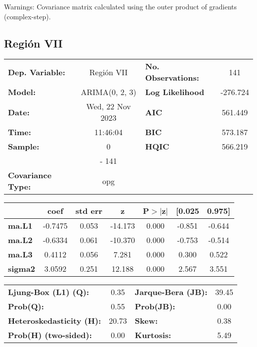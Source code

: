 \documentclass{article}%
\begin{document}
Warnings: \newline
 [1] Covariance matrix calculated using the outer product of gradients (complex-step).%
\subsection*{Región VII}%
\begin{center}
\begin{tabular}{lclc}
\toprule
\textbf{Dep. Variable:}          &    Región VII    & \textbf{  No. Observations:  } &    141      \\
\textbf{Model:}                  &  ARIMA(0, 2, 3)  & \textbf{  Log Likelihood     } &  -276.724   \\
\textbf{Date:}                   & Wed, 22 Nov 2023 & \textbf{  AIC                } &  561.449    \\
\textbf{Time:}                   &     11:46:04     & \textbf{  BIC                } &  573.187    \\
\textbf{Sample:}                 &        0         & \textbf{  HQIC               } &  566.219    \\
\textbf{}                        &       - 141      & \textbf{                     } &             \\
\textbf{Covariance Type:}        &       opg        & \textbf{                     } &             \\
\bottomrule
\end{tabular}
\begin{tabular}{lcccccc}
                & \textbf{coef} & \textbf{std err} & \textbf{z} & \textbf{P$> |$z$|$} & \textbf{[0.025} & \textbf{0.975]}  \\
\midrule
\textbf{ma.L1}  &      -0.7475  &        0.053     &   -14.173  &         0.000        &       -0.851    &       -0.644     \\
\textbf{ma.L2}  &      -0.6334  &        0.061     &   -10.370  &         0.000        &       -0.753    &       -0.514     \\
\textbf{ma.L3}  &       0.4112  &        0.056     &     7.281  &         0.000        &        0.300    &        0.522     \\
\textbf{sigma2} &       3.0592  &        0.251     &    12.188  &         0.000        &        2.567    &        3.551     \\
\bottomrule
\end{tabular}
\begin{tabular}{lclc}
\textbf{Ljung-Box (L1) (Q):}     &  0.35 & \textbf{  Jarque-Bera (JB):  } & 39.45  \\
\textbf{Prob(Q):}                &  0.55 & \textbf{  Prob(JB):          } &  0.00  \\
\textbf{Heteroskedasticity (H):} & 20.73 & \textbf{  Skew:              } &  0.38  \\
\textbf{Prob(H) (two-sided):}    &  0.00 & \textbf{  Kurtosis:          } &  5.49  \\
\bottomrule
\end{tabular}
\end{center}
\end{document}
